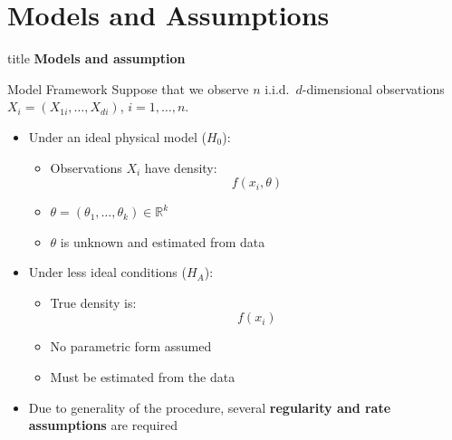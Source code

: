 \section{Models and Assumptions}
\begin{frame}{\hspace{3cm}}
\centering

\vspace{1.5cm}

\begin{beamercolorbox}[sep=20pt,center,rounded=true,shadow=true]{title}
    {\fontsize{20}{24}\selectfont \textbf{Models and assumption}}
\end{beamercolorbox}

\vspace{0.8cm}


\vfill

\end{frame}

\begin{frame}{Model Framework}
Suppose that we observe $n$ i.i.d.\ $d$-dimensional observations 
$X_i = (X_{1i}, \ldots, X_{di})$, \quad $i = 1, \ldots, n$.
\begin{itemize}
    \item Under an ideal physical model ($H_0$):
    \begin{itemize}
        \item Observations $X_i$ have density:
        \[
        f(x_i, \theta)
        \]
        \item $\theta = (\theta_1, \dots, \theta_k) \in \mathbb{R}^k$
        \item $\theta$ is unknown and estimated from data
    \end{itemize}

    \vspace{0.3cm}

    \item Under less ideal conditions ($H_A$):
    \begin{itemize}
        \item True density is:
        \[
        f(x_i)
        \]
        \item No parametric form assumed
        \item Must be estimated from the data
    \end{itemize}

    \vspace{0.3cm}

    \item Due to generality of the procedure, several \textbf{regularity and rate assumptions} are required
\end{itemize}
\end{frame}

